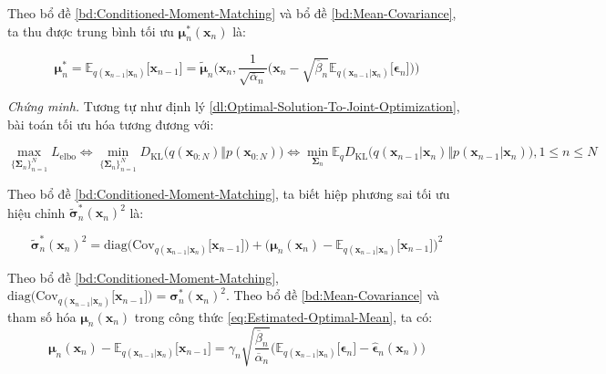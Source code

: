 \documentclass[14pt, a4paper]{article}
\numberwithin{equation}{section}
\numberwithin{figure}{section}
\numberwithin{dl}{section}
\numberwithin{md}{section}
\numberwithin{bd}{section}
\numberwithin{dn}{section}
\numberwithin{hq}{section}
\begin{document}
    Theo bổ đề \ref{bd:Conditioned-Moment-Matching} và bổ đề \ref{bd:Mean-Covariance}, ta thu được trung bình tối ưu $\boldsymbol{\mu}_n^{\ast} (\boldsymbol{x}_n)$ là:

    \begin{equation}
        \boldsymbol{\mu}_n^{\ast}=\mathbb{E}_{q(\boldsymbol{x}_{n-1} \vert \boldsymbol{x}_n)} \lbrack \boldsymbol{x}_{n-1} \rbrack = \tilde{\boldsymbol{\mu}}_n \Big( \boldsymbol{x}_n, \dfrac{1}{\sqrt{\overline{\alpha}_n}} \big( \boldsymbol{x}_n - \sqrt{\overline{\beta}_n} \mathbb{E}_{q(\boldsymbol{x}_{n-1} \vert \boldsymbol{x}_n)} \lbrack \boldsymbol{\epsilon}_n \rbrack \big) \Big)
    \end{equation}

    \covariance*

    \textit{Chứng minh.}
    Tương tự như định lý \ref{dl:Optimal-Solution-To-Joint-Optimization}, bài toán tối ưu hóa tương đương với:

    \begin{equation*}
        \max_{\lbrace \boldsymbol{\Sigma}_n \rbrace_{n=1}^N} L_{\mathrm{elbo}} \Leftrightarrow \min_{\lbrace \boldsymbol{\Sigma}_n \rbrace_{n=1}^N} D_{\mathrm{KL}} \big(q(\boldsymbol{x}_{0:N}) \Vert p(\boldsymbol{x}_{0:N}) \big) \Leftrightarrow \min_{\boldsymbol{\Sigma}_n} \mathbb{E}_q D_{\mathrm{KL}} \big( q(\boldsymbol{x}_{n-1} \vert \boldsymbol{x}_n) \Vert p(\boldsymbol{x}_{n-1} \vert \boldsymbol{x}_n) \big), 1 \leq n \leq N
    \end{equation*}

    Theo bổ đề \ref{bd:Conditioned-Moment-Matching}, ta biết hiệp phương sai tối ưu hiệu chỉnh $\tilde{\boldsymbol{\sigma}}_n^{\ast} (\boldsymbol{x}_n)^2$ là:

    \begin{equation}
        \tilde{\boldsymbol{\sigma}}_n^{\ast} (\boldsymbol{x}_n)^2 = \mathrm{diag} \big(\mathrm{Cov}_{q(\boldsymbol{x}_{n-1} \vert \boldsymbol{x}_n)} \lbrack \boldsymbol{x}_{n-1} \rbrack \big) + \big( \boldsymbol{\mu}_n (\boldsymbol{x}_n) - \mathbb{E}_{q(\boldsymbol{x}_{n-1} \vert \boldsymbol{x}_n)} \lbrack \boldsymbol{x}_{n-1} \rbrack\big)^2
    \end{equation}

    Theo bổ đề \ref{bd:Conditioned-Moment-Matching}, $\mathrm{diag} \big( \mathrm{Cov}_{q(\boldsymbol{x}_{n-1} \vert \boldsymbol{x}_n)} \lbrack \boldsymbol{x}_{n-1} \rbrack \big) = \boldsymbol{\sigma}_n^{\ast} (\boldsymbol{x}_n)^2$.
    Theo bổ đề \ref{bd:Mean-Covariance} và tham số hóa $\boldsymbol{\mu}_n (\boldsymbol{x}_n)$ trong công thức \ref{eq:Estimated-Optimal-Mean}, ta có:
    \begin{equation}
        \boldsymbol{\mu}_n (\boldsymbol{x}_n) - \mathbb{E}_{q(\boldsymbol{x}_{n-1} \vert \boldsymbol{x}_n)} \lbrack \boldsymbol{x}_{n-1} \rbrack = \gamma_n \sqrt{\dfrac{\overline{\beta}_n}{\overline{\alpha}_n}} \big( \mathbb{E}_{q(\boldsymbol{x}_{n-1} \vert \boldsymbol{x}_n)} \lbrack \boldsymbol{\epsilon}_n \rbrack - \hat{\boldsymbol{\epsilon}}_n (\boldsymbol{x}_n) \big)
    \end{equation}
\end{document}
